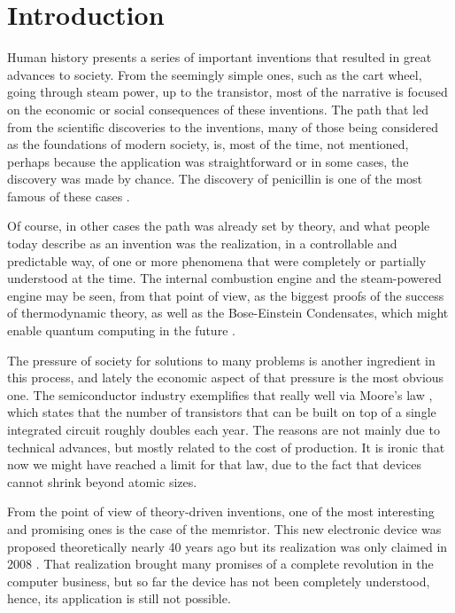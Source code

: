 \chapter{Introduction}
\label{cap:intro}

Human history presents a series of important inventions that resulted in great advances to society. From the seemingly simple ones, such as the cart wheel, going through steam power, up to the transistor, most of the narrative is focused on the economic or social consequences of these inventions. The path that led from the scientific discoveries to the inventions, many of those being considered as the foundations of modern society, is, most of the time, not mentioned, perhaps because the application was straightforward or in some cases, the discovery was made by chance. The discovery of penicillin is one of the most famous of these cases \cite{Flemming1929}. 

Of course, in other cases the path was already set by theory, and what people today describe as an invention was the realization, in a controllable and predictable way, of one or more phenomena that were completely or partially understood at the time. The internal combustion engine and the steam-powered engine may be seen, from that point of view, as the biggest proofs of the success of thermodynamic theory, as well as the Bose-Einstein Condensates, which might enable quantum computing in the future \cite{Vinit2013}.

The pressure of society for solutions to many problems is another ingredient in this process, and lately the economic aspect of that pressure is the most obvious one. The semiconductor industry exemplifies that really well via Moore's law \cite{Moore1998}, which states that the number of transistors that can be built on top of a single integrated circuit roughly doubles each year. The reasons are not mainly due to technical advances, but mostly related to the cost of production. It is ironic that now we might have reached a limit for that law, due to the fact that devices cannot shrink beyond atomic sizes.

From the point of view of theory-driven inventions, one of the most interesting and promising ones is the case of the memristor. This new electronic device was proposed theoretically nearly 40 years ago \cite{Chua1971,Chua1976} but its realization was only claimed in 2008 \cite{Williams2008}. That realization brought many promises of a complete revolution in the computer business, but so far the device has not been completely understood, hence, its application is still not possible.

